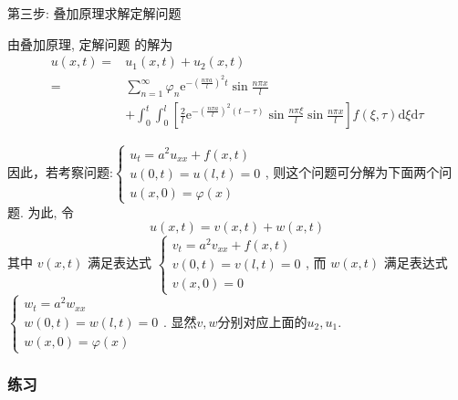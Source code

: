 第三步: 叠加原理求解定解问题

由叠加原理, 定解问题 的解为
$$
\begin{aligned}
u(x, t)= & u_{1}(x, t)+u_{2}(x, t) \\
= & \sum_{n=1}^{\infty} \varphi_{n} \mathrm{e}^{-\left(\frac{n \pi a}{l}\right)^{2} t} \sin \frac{n \pi x}{l} \\
& +\int_{0}^{t} \int_{0}^{l}\left[\frac{2}{l} \mathrm{e}^{-\left(\frac{n \pi a}{l}\right)^{2}(t-\tau)} \sin \frac{n \pi \xi}{l} \sin \frac{n \pi x}{l}\right] f(\xi, \tau) \mathrm{d} \xi \mathrm{d} \tau
\end{aligned}
$$

因此，若考察问题:$
\left\{\begin{array}{l}
u_{t}=a^{2} u_{x x}+f(x, t) \\
u(0, t)=u(l, t)=0 \\
u(x, 0)=\varphi(x)
\end{array}\right.$,
则这个问题可分解为下面两个问题. 为此, 令
$$
u(x, t)=v(x, t)+w(x, t)
$$
其中 $ v(x, t) $ 满足表达式
$
\left\{\begin{array}{l}
v_{t}=a^{2} v_{x x}+f(x, t) \\
v(0, t)=v(l, t)=0 \\
v(x, 0)=0
\end{array}\right.
$,
而 $ w(x, t) $ 满足表达式
$
\left\{\begin{array}{l}
w_{t}=a^{2} w_{x x} \\
w(0, t)=w(l, t)=0 \\
w(x, 0)=\varphi(x)
\end{array}\right.
$.
显然$v,w$分别对应上面的$u_2,u_1$.
\subsubsection{练习}

